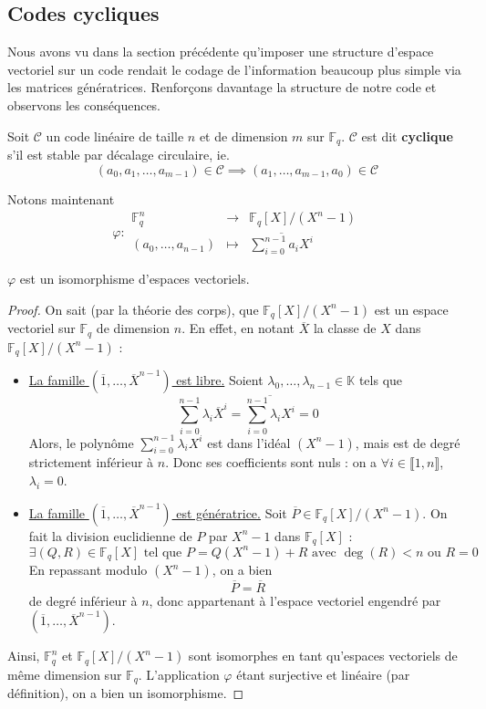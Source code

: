 	\subsection{Codes cycliques}
	
	Nous avons vu dans la section précédente qu'imposer une structure d'espace vectoriel sur un code rendait le codage de l'information beaucoup plus simple via les matrices génératrices. Renforçons davantage la structure de notre code et observons les conséquences.
	
	\begin{definition}
		Soit $\mathcal{C}$ un code linéaire de taille $n$ et de dimension $m$ sur $\mathbb{F}_q$. $\mathcal{C}$ est dit \textbf{cyclique} s'il est stable par décalage circulaire, ie.
		\[ (a_0, a_1, \dots, a_{m-1}) \in \mathcal{C} \implies (a_1, \dots, a_{m-1}, a_0) \in \mathcal{C} \]
	\end{definition}
	
	Notons maintenant
	\[
		\varphi :
		\begin{array}{ccc}
			\mathbb{F}_q^n &\rightarrow& \mathbb{F}_q[X]/(X^n-1) \\
			(a_0, \dots, a_{n-1}) &\mapsto& \overline{\sum_{i=0}^{n-1} a_i X^i}
		\end{array}
	\]
	
	\begin{lemma}
		$\varphi$ est un isomorphisme d'espaces vectoriels.
	\end{lemma}
	
	\begin{proof}
		On sait (par la théorie des corps), que $\mathbb{F}_q[X]/(X^n-1)$ est un espace vectoriel sur $\mathbb{F}_q$ de dimension $n$. En effet, en notant $\overline{X}$ la classe de $X$ dans $\mathbb{F}_q[X]/(X^n-1)$ :
		\begin{itemize}
			\item \underline{La famille $(\overline{1}, \dots, \overline{X}^{n-1})$ est libre.} Soient $\lambda_0, \dots, \lambda_{n-1} \in \mathbb{K}$ tels que
			\[ \sum_{i=0}^{n-1} \lambda_i \overline{X}^i = \overline{\sum_{i=0}^{n-1} \lambda_i X^i} = 0 \]
			Alors, le polynôme $\sum_{i=0}^{n-1} \lambda_i X^i$ est dans l'idéal $(X^n-1)$, mais est de degré strictement inférieur à $n$. Donc ses coefficients sont nuls : on a $\forall i \in \llbracket 1, n \rrbracket$, $\lambda_i = 0$.
			\item \underline{La famille $(\overline{1}, \dots, \overline{X}^{n-1})$ est génératrice.} Soit $\overline{P} \in \mathbb{F}_q[X]/(X^n-1)$. On fait la division euclidienne de $P$ par $X^n - 1$ dans $\mathbb{F}_q[X]$ :
			\[ \exists (Q,R) \in \mathbb{F}_q[X] \text{ tel que } P = Q(X^n-1) + R \text{ avec } \deg(R) < n \text{ ou } R = 0 \]
			En repassant modulo $(X^n - 1)$, on a bien
			\[ \overline{P} = \overline{R} \]
			de degré inférieur à $n$, donc appartenant à l'espace vectoriel engendré par $(\overline{1}, \dots, \overline{X}^{n-1})$.
		\end{itemize}
		Ainsi, $\mathbb{F}_q^n$ et $\mathbb{F}_q[X]/(X^n-1)$ sont isomorphes en tant qu'espaces vectoriels de même dimension sur $\mathbb{F}_q$. L'application $\varphi$ étant surjective et linéaire (par définition), on a bien un isomorphisme.
	\end{proof}
	
